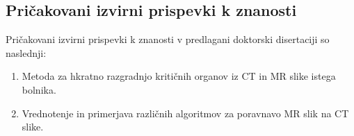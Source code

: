 \documentclass[a4paper,twoside,11pt]{article}
\begin{document}
	  
	
	\subsubsection*{}
	\par{}
	\subsection{Pričakovani izvirni prispevki k znanosti}
	\par{\noindent
		Pričakovani izvirni prispevki k znanosti v predlagani doktorski disertaciji so naslednji:
		\begin{enumerate}
			\item Metoda za hkratno razgradnjo kritičnih organov iz CT in MR slike istega bolnika.
			\item Vrednotenje in primerjava različnih algoritmov za poravnavo MR slik na CT slike.

		\end{enumerate}
	}
\end{document}
